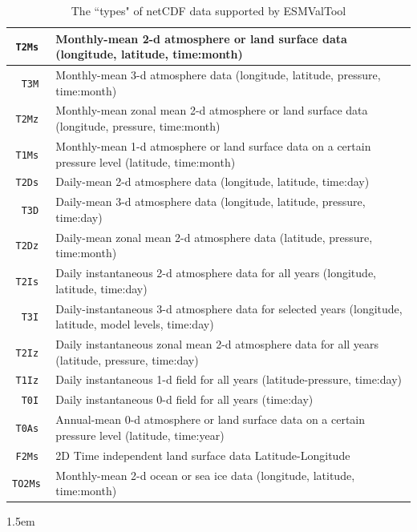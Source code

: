 \documentclass[12pt]{article}
\begin{document}
%
%
\begin{table} 
\centering
\footnotesize
\begin{tabular}{|r|l|}
\hline
\texttt{T2Ms } & Monthly-mean 2-d atmosphere or land surface data (longitude, latitude, time:month)\\
\hline
\texttt{T3M } & Monthly-mean 3-d atmosphere data (longitude, latitude, pressure, time:month) \\
\hline
\texttt{T2Mz } & Monthly-mean zonal mean 2-d atmosphere or land surface data (longitude, pressure, time:month)\\
\hline
\texttt{T1Ms } & Monthly-mean 1-d atmosphere or land surface data on a certain  pressure level (latitude, time:month)\\
\hline
\texttt{T2Ds } & Daily-mean 2-d atmosphere data (longitude, latitude, time:day)\\
\hline
\texttt{T3D } & Daily-mean 3-d atmosphere data (longitude, latitude, pressure, time:day)\\
\hline
\texttt{T2Dz } & Daily-mean zonal mean 2-d atmosphere  data (latitude, pressure, time:month)\\
\hline
\texttt{T2Is } & Daily instantaneous 2-d atmosphere data for all years (longitude, latitude, time:day)\\
\hline
\texttt{T3I } & Daily-instantaneous 3-d atmosphere data for selected years (longitude, latitude, model levels, time:day)\\
\hline
\texttt{T2Iz } & Daily instantaneous zonal mean 2-d atmosphere data for all years (latitude, pressure, time:day)\\
\hline
\texttt{T1Iz } & Daily instantaneous 1-d field for all years (latitude-pressure, time:day)\\
\hline
\texttt{T0I } & Daily instantaneous 0-d field for all years (time:day)\\
\hline
\texttt{T0As } & Annual-mean 0-d atmosphere or land surface data on a certain  pressure level (latitude, time:year) \\
\hline
\texttt{F2Ms } & 2D Time independent land surface data Latitude-Longitude\\
\hline
\texttt{TO2Ms } & Monthly-mean 2-d ocean or sea ice data (longitude, latitude, time:month)\\
\hline
\end{tabular} 
\caption{The ``types" of netCDF data supported by
ESMValTool}\label{table:esmvaltool-types} 
\end{table}
\normalsize

\pagebreak


% 
% 

\begingroup
\raggedright
\emergencystretch 1.5em

\endgroup
\end{document}
